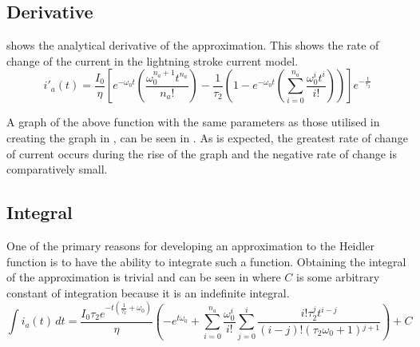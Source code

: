 \subsection{Derivative}
\label{sub:approx_derivative}
 shows the analytical derivative of the approximation. This shows the rate of change of the current in the lightning stroke current model.
\begin{equation}
    i'_{a} \left( t \right) = \frac{I_0}{\eta} \left [ e^{-\omega_0 t} \left ( \frac{\omega_0^{n_a+1} t^{n_a}}{n_a!} \right ) - \frac{1}{\tau_2} \left ( 1 - e^{-\omega_0 t}\left ( \sum_{i=0}^{n_a} \frac{\omega_0^{i} t^i}{i!} \right ) \right ) \right ] e^{-\frac{t}{\tau_2}}
    \label{eqn:approx_deriv}
\end{equation}

A graph of the above function with the same parameters as those utilised in creating the graph in , can be seen in .
As is expected, the greatest rate of change of current occurs during the rise of the graph and the negative rate of change is comparatively small.

\subsection{Integral}
One of the primary reasons for developing an approximation to the Heidler function is to have the ability to integrate such a function. Obtaining the integral of the approximation is trivial and can be seen in  where $C$ is some arbitrary constant of integration because it is an indefinite integral.
\label{sub:approx_integral}
\begin{equation}
    \int i_a \left( t \right) \, dt = \frac{I_0 \tau _2 e^{-t \left(\frac{1}{\tau _2}+\omega _0\right)}}{\eta } \left(-e^{t \omega _0} + \sum _{i=0}^{n_a} \frac{\omega _0^i}{i!} \sum _{j=0}^i \frac{i! \tau _2^j t^{i-j}}{(i-j)! \left(\tau _2 \omega _0+1\right){}^{j+1}}\right) + C
    \label{eqn:approxInt}
\end{equation}


